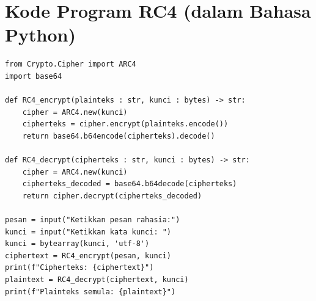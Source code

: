 \documentclass{article}
\begin{document}

\section*{Kode Program RC4 (dalam Bahasa Python)}

\begin{verbatim}
from Crypto.Cipher import ARC4
import base64

def RC4_encrypt(plainteks : str, kunci : bytes) -> str:
    cipher = ARC4.new(kunci)
    cipherteks = cipher.encrypt(plainteks.encode())
    return base64.b64encode(cipherteks).decode()

def RC4_decrypt(cipherteks : str, kunci : bytes) -> str:
    cipher = ARC4.new(kunci)
    cipherteks_decoded = base64.b64decode(cipherteks)
    return cipher.decrypt(cipherteks_decoded)

pesan = input("Ketikkan pesan rahasia:")
kunci = input("Ketikkan kata kunci: ")
kunci = bytearray(kunci, 'utf-8')
ciphertext = RC4_encrypt(pesan, kunci)
print(f"Cipherteks: {ciphertext}")
plaintext = RC4_decrypt(ciphertext, kunci)
print(f"Plainteks semula: {plaintext}")
\end{verbatim}
\end{document}
